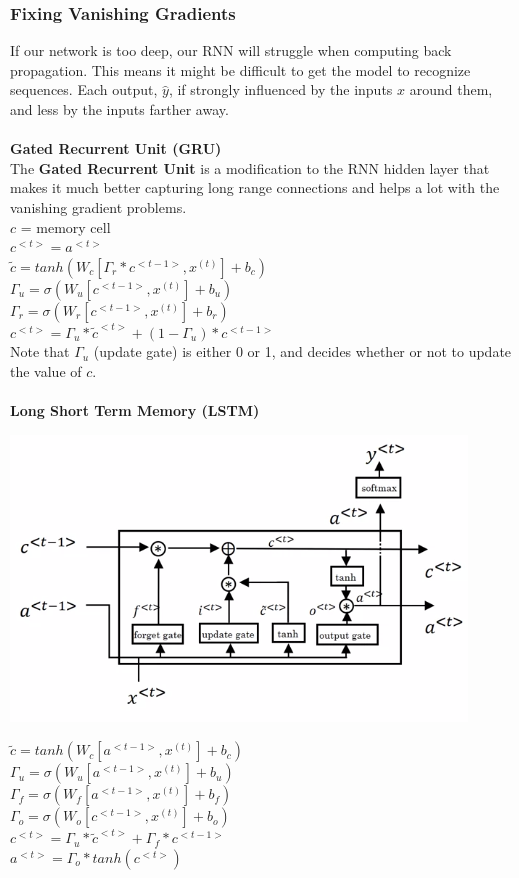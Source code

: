 \documentclass[11pt, a4paper]{article}
\begin{document}
\begin{spacing}{1.1}
	\subsubsection{Fixing Vanishing Gradients}
	If our network is too deep, our RNN will struggle when computing back propagation. This means it might be difficult to get the model to recognize sequences. Each output, $\hat{y}$, if strongly influenced by the inputs $x$ around them, and less by the inputs farther away.\\~\\
	\textbf{Gated Recurrent Unit (GRU)}\vspace*{1mm}\\
	The \textbf{Gated Recurrent Unit} is a modification to the RNN hidden layer that makes it much better capturing long range connections and helps a lot with the vanishing gradient problems. \vspace*{2mm}\\
	$c$ = memory cell \\
	$c^{<t>} = a^{<t>}$\\
	$\tilde{c} = tanh(W_c[\Gamma_r*c^{<t-1>}, x^{(t)}] + b_c)$\\
	$\Gamma_u = \sigma(W_u[c^{<t-1>}, x^{(t)}] + b_u)$\\
	$\Gamma_r = \sigma(W_r[c^{<t-1>}, x^(t)] + b_r)$ \\
	$c^{<t>} = \Gamma_u * \tilde{c}^{<t>} +(1-\Gamma_u) * c^{<t-1>}$\vspace*{2mm}\\
	Note that $\Gamma_u$ (update gate) is either 0 or 1, and decides whether or not to update the value of $c$. \\~\\	
	\textbf{Long Short Term Memory (LSTM)}
	\begin{center}
	\includegraphics[scale=.7]{lstm}
	\end{center}
	$\tilde{c} = tanh(W_c[a^{<t-1>}, x^{(t)}] + b_c)$\\
	$\Gamma_u = \sigma(W_u[a^{<t-1>}, x^{(t)}] + b_u)$\\
	$\Gamma_f = \sigma(W_f[a^{<t-1>}, x^{(t)}] + b_f)$\\
	$\Gamma_o = \sigma(W_o[c^{<t-1>}, x^{(t)}] + b_o)$\\
	$c^{<t>} = \Gamma_u * \tilde{c}^{<t>} + \Gamma_f * c^{<t-1>}$\\
	$a^{<t>} = \Gamma_o * tanh(c^{<t>})$

\end{spacing}
\end{document}
